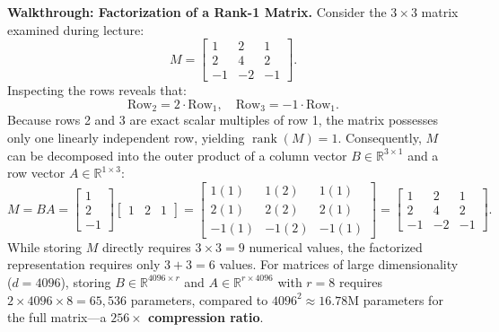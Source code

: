 \documentclass[../../../main.tex]{subfiles}
\begin{document}
\noindent\textbf{Walkthrough: Factorization of a Rank-1 Matrix.}
Consider the $3 \times 3$ matrix examined during lecture:
\begin{equation}
M = \begin{bmatrix} 1 & 2 & 1 \\ 2 & 4 & 2 \\ -1 & -2 & -1 \end{bmatrix}.
\end{equation}
Inspecting the rows reveals that:
\begin{equation}
\text{Row}_2 = 2 \cdot \text{Row}_1, \quad \text{Row}_3 = -1 \cdot \text{Row}_1.
\end{equation}
Because rows 2 and 3 are exact scalar multiples of row 1, the matrix possesses only one linearly independent row, yielding $\operatorname{rank}(M) = 1$. Consequently, $M$ can be decomposed into the outer product of a column vector $B \in \mathbb{R}^{3 \times 1}$ and a row vector $A \in \mathbb{R}^{1 \times 3}$:
\begin{equation}
M = B A = \begin{bmatrix} 1 \\ 2 \\ -1 \end{bmatrix} \begin{bmatrix} 1 & 2 & 1 \end{bmatrix} = \begin{bmatrix} 1(1) & 1(2) & 1(1) \\ 2(1) & 2(2) & 2(1) \\ -1(1) & -1(2) & -1(1) \end{bmatrix} = \begin{bmatrix} 1 & 2 & 1 \\ 2 & 4 & 2 \\ -1 & -2 & -1 \end{bmatrix}.
\end{equation}
While storing $M$ directly requires $3 \times 3 = 9$ numerical values, the factorized representation requires only $3 + 3 = 6$ values. For matrices of large dimensionality ($d = 4096$), storing $B \in \mathbb{R}^{4096 \times r}$ and $A \in \mathbb{R}^{r \times 4096}$ with $r = 8$ requires $2 \times 4096 \times 8 = 65{,}536$ parameters, compared to $4096^2 \approx 16.78\text{M}$ parameters for the full matrix—a \textbf{$256\times$ compression ratio}.
\end{document}

